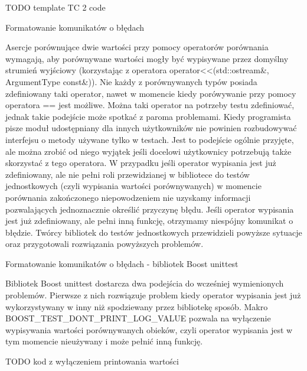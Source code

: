 TODO template TC 2 code

Formatowanie komunikatów o błędach

Asercje porównujące dwie wartości przy pomocy operatorów porównania wymagają, aby porównywane wartości mogły być wypisywane przez domyślny strumień wyjściowy (korzystając z operatora operator<<(std::ostream&, ArgumentType const&)). 
Nie każdy z porównywanych typów posiada zdefiniowany taki operator, nawet w momencie kiedy porówywanie przy pomocy operatora == jest możliwe. Można taki operator na potrzeby testu zdefiniować, jednak takie podejście może spotkać z paroma problemami.
Kiedy programista pisze moduł udostępniany dla innych użytkowników nie powinien rozbudowywać interfejsu o metody używane tylko w testach. Jest to podejście ogólnie przyjęte, ale można zrobić od niego wyjątek jeśli docelowi użytkownicy potrzebują także skorzystać z tego operatora.
W przypadku jeśli operator wypisania jest już zdefiniowany, ale nie pełni roli przewidzianej w bibliotece do testów jednostkowych (czyli wypisania wartości porównywanych) w momencie porównania zakończonego niepowodzeniem nie uzyskamy informacji pozwalających jednoznacznie określić przyczynę błędu.
Jeśli operator wypisania jest już zdefiniowany, ale pełni inną funkcję, otrzymamy niespójny komunikat o błędzie.
Twórcy bibliotek do testów jednostkowych przewidzieli powyższe sytuacje oraz przygotowali rozwiązania powyższych problemów.

Formatowanie komunikatów o błędach - bibliotek Boost unittest

Bibliotek Boost unittest dostarcza dwa podejścia do wcześniej wymienionych problemów.
Pierwsze z nich rozwiązuje problem kiedy operator wypisania jest już wykorzystywany w inny niż spodziewany przez bibliotekę sposób. Makro BOOST_TEST_DONT_PRINT_LOG_VALUE pozwala na wyłączenie wypisywania wartości porównywanych obieków, czyli operator wypisania jest w tym momencie nieużywany i może pełnić inną funkcję.

TODO kod z wyłączeniem printowania wartości


